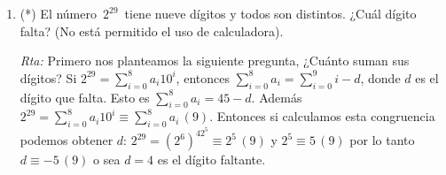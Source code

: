 \documentclass[12pt,spanish,makeidx]{amsbook}
\newcommand{\rta}{\noindent\textit{Rta: }}
\newcommand{\md}[1]{{\,}\left(#1\right)}
\begin{document}
\begin{enumerate}
	\item (*) El número \,$2^{29}$\, tiene nueve dígitos y todos son distintos.
	¿Cuál dígito falta? (No está permitido el uso de calculadora).
	
	\rta Primero nos planteamos la siguiente pregunta, ¿Cuánto suman sus dígitos? Si $2^{29} =  \sum_{i=0}^8 a_i10^i$, entonces  $\sum_{i=0}^8 a_i= \sum_{i=0}^9i-d$, donde $d$ es el dígito que falta.
	Esto es $\sum_{i=0}^8 a_i= 45-d$. Además $2^{29} = \sum_{i=0}^8 a_i10^i \equiv \sum_{i=0}^8 a_i\md{9} $. 	Entonces si calculamos esta congruencia podemos obtener $d$: 
	$2^{29}=(2^6)^42^5\equiv 2^5 \md{9}$ y $2^5\equiv 5 \md{9}$ por lo tanto $d\equiv -5 \md{9}$ o sea $d=4$ es el dígito faltante. 
	
\end{enumerate}
\end{document}
